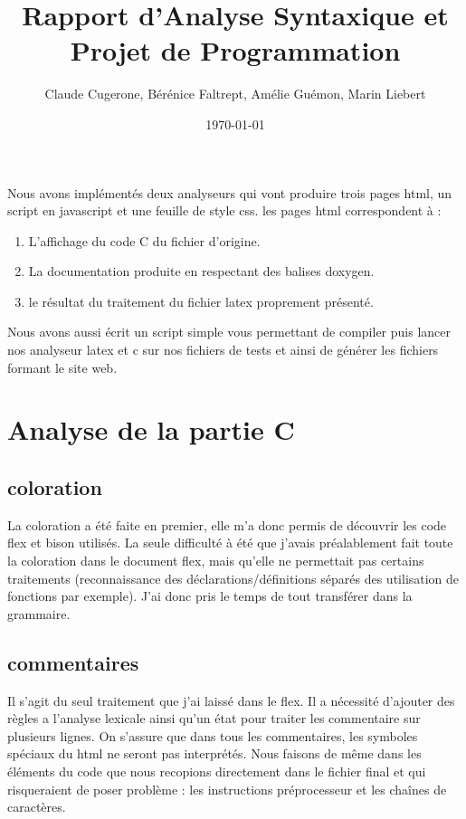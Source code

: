 \documentclass[10pt,a4paper]{report}
\title{Rapport d'Analyse Syntaxique et Projet de Programmation}
\date{\today}
\author{Claude Cugerone, Bérénice Faltrept, Amélie Guémon, Marin Liebert}
\begin{document}
\maketitle

Nous avons implémentés deux analyseurs qui vont produire trois pages html, un script en javascript et une feuille de style css. les pages html correspondent à : 
\begin{enumerate}
	\item L'affichage du code C du fichier d'origine.
	\item La documentation produite en respectant des balises doxygen.
	\item le résultat du traitement du fichier latex proprement présenté.
\end{enumerate}

Nous avons aussi écrit un script simple vous permettant de compiler puis lancer nos analyseur latex et c sur nos fichiers de tests et ainsi de générer les fichiers formant le site web. \\

\section{Analyse de la partie C}

\subsection{coloration}
La coloration a été faite en premier, elle m'a donc permis de découvrir les code flex et bison utilisés. La seule difficulté à été que j'avais préalablement fait toute la coloration dans le document flex, mais qu'elle ne permettait pas certains traitements (reconnaissance des déclarations/définitions séparés des utilisation de fonctions par exemple). J'ai donc pris le temps de tout transférer dans la grammaire. 

\subsection{commentaires}
Il s'agit du seul traitement que j'ai laissé dans le flex. Il a nécessité d'ajouter des règles a l'analyse lexicale ainsi qu'un état pour traiter les commentaire sur plusieurs lignes. \newline
On s'assure que dans tous les commentaires, les symboles spéciaux du html ne seront pas interprétés. Nous faisons de même dans les éléments du code que nous recopions directement dans le fichier final et qui risqueraient de poser problème : les instructions préprocesseur et les chaînes de caractères.
\end{document}
